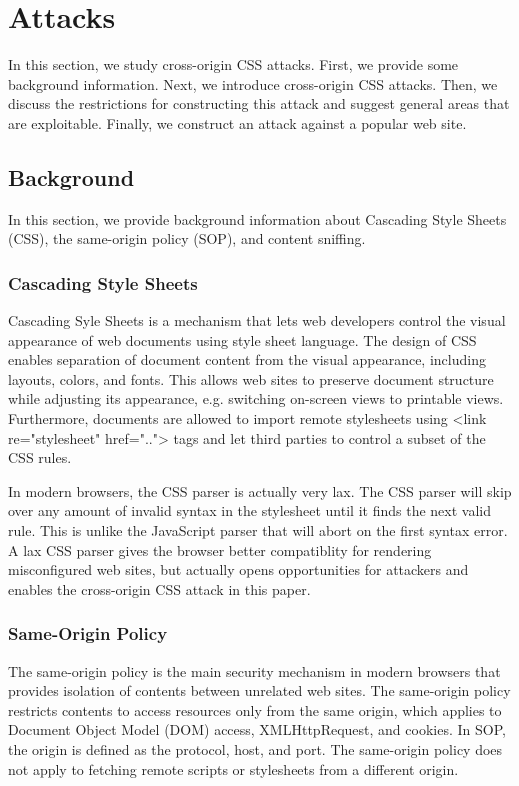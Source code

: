 \documentclass{acm_proc_article-sp}
\begin{document}
\section{Attacks}
In this section, we study cross-origin CSS attacks. First, we provide some background information. Next, we introduce cross-origin CSS attacks. Then, we discuss the restrictions for constructing this attack and suggest general areas that are exploitable. Finally, we construct an attack against a popular web site.

\subsection{Background}
In this section, we provide background information about Cascading Style Sheets (CSS), the same-origin policy (SOP), and content sniffing.

\subsubsection{Cascading Style Sheets}
Cascading Syle Sheets\cite{css} is a mechanism that lets web developers control the visual appearance of web documents using style sheet language. The design of CSS enables separation of document content from the visual appearance, including layouts, colors, and fonts. This allows web sites to preserve document structure while adjusting its appearance, e.g. switching on-screen views to printable views. Furthermore, documents are allowed to import remote stylesheets using <link re="stylesheet" href=".."> tags and let third parties to control a subset of the CSS rules.

In modern browsers, the CSS parser is actually very lax. The CSS parser will skip over any amount of invalid syntax in the stylesheet until it finds the next valid rule. This is unlike the JavaScript parser that will abort on the first syntax error. A lax CSS parser gives the browser better compatiblity for rendering misconfigured web sites, but actually opens opportunities for attackers and enables the cross-origin CSS attack in this paper.

\subsubsection{Same-Origin Policy}
The same-origin policy\cite{mozillasameorigin} is the main security mechanism in modern browsers that provides isolation of contents between unrelated web sites. The same-origin policy restricts contents to access resources only from the same origin, which applies to Document Object Model (DOM)\cite{dom} access, XMLHttpRequest, and cookies. In SOP, the origin is defined as the protocol, host, and port. The same-origin policy does not apply to fetching remote scripts or stylesheets from a different origin.
\end{document}
